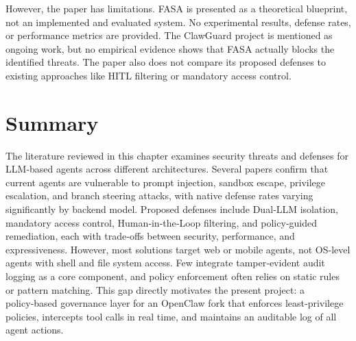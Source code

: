 \documentclass[a4paper]{report}
\begin{document}
However, the paper has limitations. FASA is presented as a theoretical blueprint, not an implemented and evaluated system. No experimental results, defense rates, or performance metrics are provided. The ClawGuard project is mentioned as ongoing work, but no empirical evidence shows that FASA actually blocks the identified threats. The paper also does not compare its proposed defenses to existing approaches like HITL filtering or mandatory access control.

\section{Summary}
The literature reviewed in this chapter examines security threats and defenses for LLM‑based agents across different architectures. Several papers confirm that current agents are vulnerable to prompt injection, sandbox escape, privilege escalation, and branch steering attacks, with native defense rates varying significantly by backend model. Proposed defenses include Dual‑LLM isolation, mandatory access control, Human‑in‑the‑Loop filtering, and policy‑guided remediation, each with trade‑offs between security, performance, and expressiveness. However, most solutions target web or mobile agents, not OS‑level agents with shell and file system access. Few integrate tamper‑evident audit logging as a core component, and policy enforcement often relies on static rules or pattern matching. This gap directly motivates the present project: a policy‑based governance layer for an OpenClaw fork that enforces least‑privilege policies, intercepts tool calls in real time, and maintains an auditable log of all agent actions.



\printbibliography[heading=bibintoc, title={References}]
\begin{appendices}





\end{appendices}
\end{document}
